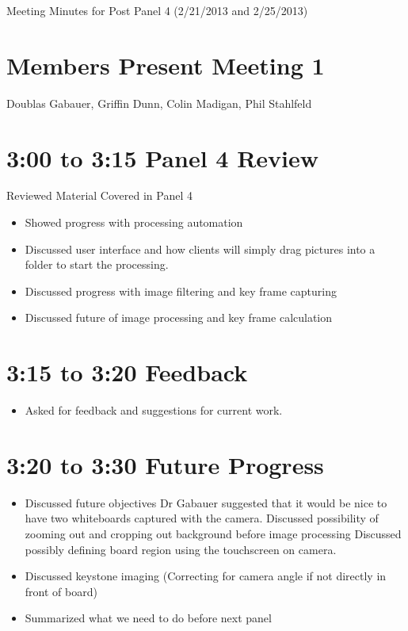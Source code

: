 \documentclass[]{article}
\begin{document}
	Meeting Minutes for Post Panel 4 (2/21/2013 and 2/25/2013)
	
	\section*{Members Present Meeting 1}
		Doublas Gabauer, Griffin Dunn, Colin Madigan, Phil Stahlfeld
	\section*{3:00 to 3:15 Panel 4 Review}
		\noindent Reviewed Material Covered in Panel 4
		\begin{itemize}
				\item Showed progress with processing automation
				\item Discussed user interface and how clients will simply drag pictures into a folder to start the processing.
				\item Discussed progress with image filtering and key frame capturing
				\item Discussed future of image processing and key frame calculation
		\end{itemize}
	
	\section*{3:15 to 3:20 Feedback}
		\begin{itemize}
			\item Asked for feedback and suggestions for current work.
		\end{itemize}
	\section*{3:20 to 3:30 Future Progress}
	
			\begin{itemize}
				\item Discussed future objectives
					\subitem Dr Gabauer suggested that it would be nice to have two whiteboards captured with the camera.
					\subitem Discussed possibility of zooming out and cropping out background before image processing
					\subitem Discussed possibly defining board region using the touchscreen on camera.
				\item Discussed keystone imaging
					\subitem (Correcting for camera angle if not directly in front of board)
				
				\item Summarized what we need to do before next panel
			\end{itemize}
			
\end{document}
